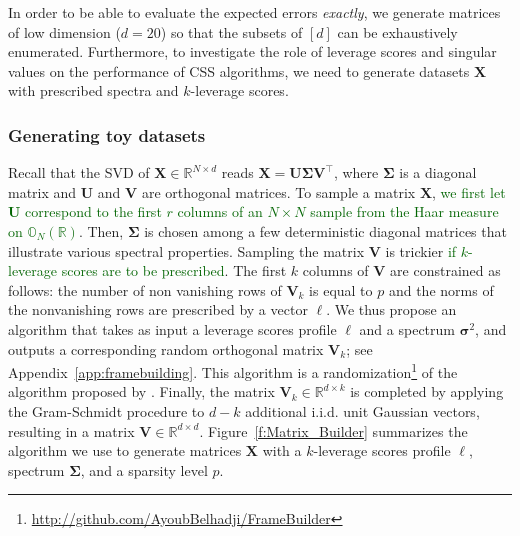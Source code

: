 \documentclass[twoside,11pt]{book}
\newcommand{\rev}[1]{\textcolor{darkgreen}{#1}}
\numberwithin{theorem}{chapter}
\numberwithin{definition}{chapter}
\numberwithin{proposition}{chapter}
\numberwithin{corollary}{chapter}
\numberwithin{example}{chapter}
\numberwithin{lemma}{chapter}
\numberwithin{assumption}{chapter}
\DeclareMathOperator{\Tran}{\intercal}
\newcommand{\rb}[1]{\textcolor{magenta}{#1}}
\begin{document}
In order to be able to evaluate the expected errors \emph{exactly}, we generate matrices of low dimension ($d = 20$) so that the subsets of $[d]$ can be exhaustively enumerated. Furthermore, to investigate the role of leverage scores and singular values on the performance of CSS algorithms, we need to generate datasets $\bm{X}$ with prescribed spectra and $k$-leverage scores.

\subsubsection{Generating toy datasets}
Recall that the SVD of $\bm{X}\in\mathbb{R}^{N\times d}$ reads $\bm{X} = \bm{U}\bm{\Sigma}\bm{V}^{\Tran}$, where $\bm{\Sigma}$ is a diagonal matrix and $\bm{U}$ and $\bm{V}$ are orthogonal matrices. To sample a matrix $\bm{X}$, \rev{we first let $\bm{U}$ correspond to the first $r$ columns of an $N \times N$ sample from the Haar measure on $\mathbb{O}_{N}(\mathbb{R})$}. Then, $\bm{\Sigma}$ is chosen among a few deterministic diagonal matrices that illustrate various spectral properties. Sampling the matrix $\bm{V}$ is trickier \rev{if $k$-leverage scores are to be prescribed}. The first $k$ columns of $\bm{V}$ are constrained as follows: the number of non vanishing rows of $\bm{V}_{k}$ is equal to $p$ and the norms of the nonvanishing rows are prescribed by a vector $\bm{\ell}$.
We thus propose an algorithm that takes as input a leverage scores profile $\bm{\ell}$ and a spectrum $\bm{\sigma}^2$, and outputs a corresponding random orthogonal matrix $\bm{V}_k$; see Appendix~\ref{app:framebuilding}. This algorithm is a randomization\footnote{\url{http://github.com/AyoubBelhadji/FrameBuilder}} of the algorithm proposed by \cite*{FMPS13}.  Finally, the matrix $\bm{V}_{k} \in \mathbb{R}^{d \times k}$ is completed by applying the Gram-Schmidt procedure to $d-k$ additional i.i.d. unit Gaussian vectors, resulting in a matrix $\bm{V} \in \mathbb{R}^{d \times d}$. Figure~\ref{f:Matrix_Builder} summarizes the algorithm we use to generate matrices $\bm{X}$ with a $k$-leverage scores profile $\bm{\ell}$, spectrum $\bm{\Sigma}$, and a sparsity level $p$.
\end{document}
